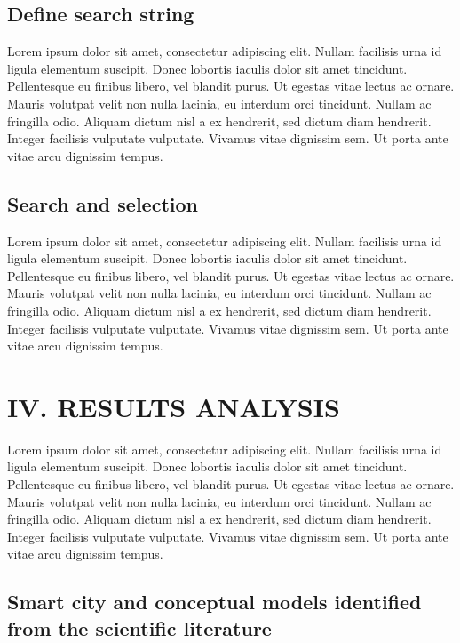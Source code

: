 \documentclass[a4paper,fleqn,spanish]{cas-dc}
\begin{document}
\subsection{Define search string}\label{cadena}

Lorem ipsum dolor sit amet, consectetur adipiscing elit. Nullam facilisis urna
id ligula elementum suscipit. Donec lobortis iaculis dolor sit amet tincidunt.
Pellentesque eu finibus libero, vel blandit purus. Ut egestas vitae lectus ac
ornare. Mauris volutpat velit non nulla lacinia, eu interdum orci tincidunt.
Nullam ac fringilla odio. Aliquam dictum nisl a ex hendrerit, sed dictum diam
hendrerit. Integer facilisis vulputate vulputate. Vivamus vitae dignissim sem.
Ut porta ante vitae arcu dignissim tempus.


\subsection{Search and selection}\label{seleccion}

Lorem ipsum dolor sit amet, consectetur adipiscing elit. Nullam facilisis urna
id ligula elementum suscipit. Donec lobortis iaculis dolor sit amet tincidunt.
Pellentesque eu finibus libero, vel blandit purus. Ut egestas vitae lectus ac
ornare. Mauris volutpat velit non nulla lacinia, eu interdum orci tincidunt.
Nullam ac fringilla odio. Aliquam dictum nisl a ex hendrerit, sed dictum diam
hendrerit. Integer facilisis vulputate vulputate. Vivamus vitae dignissim sem.
Ut porta ante vitae arcu dignissim tempus.


\section{IV. RESULTS ANALYSIS}\label{resultados}

Lorem ipsum dolor sit amet, consectetur adipiscing elit. Nullam facilisis urna
id ligula elementum suscipit. Donec lobortis iaculis dolor sit amet tincidunt.
Pellentesque eu finibus libero, vel blandit purus. Ut egestas vitae lectus ac
ornare. Mauris volutpat velit non nulla lacinia, eu interdum orci tincidunt.
Nullam ac fringilla odio. Aliquam dictum nisl a ex hendrerit, sed dictum diam
hendrerit. Integer facilisis vulputate vulputate. Vivamus vitae dignissim sem.
Ut porta ante vitae arcu dignissim tempus.


\subsection{Smart city and conceptual models identified from the scientific literature}\label{sci-lit}
\end{document}

